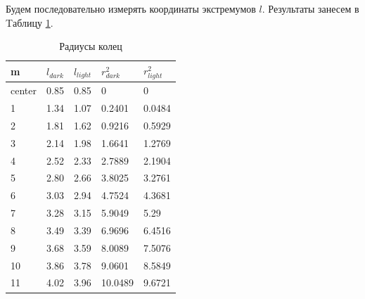 \documentclass[a4paper,12pt]{article}
\begin{document}
	Будем последовательно измерять координаты экстремумов $ l $. Результаты занесем в Tаблицу \ref{table::rings}.
	
\newpage
\begin{table}
\begin{minipage}{0.5\textwidth}
\begin{tabular}{|l|l|l|l|l|}
\hline
m      & $l_{dark}$ & $l_{light}$ & $r_{dark}^2$ & $r_{light}^2$ \\ \hline
center & 0.85           & 0.85            & 0                         & 0                          \\ \hline
1      & 1.34           & 1.07            & 0.2401                    & 0.0484                     \\ \hline
2      & 1.81           & 1.62            & 0.9216                    & 0.5929                     \\ \hline
3      & 2.14           & 1.98            & 1.6641                    & 1.2769                     \\ \hline
4      & 2.52           & 2.33            & 2.7889                    & 2.1904                     \\ \hline
5      & 2.80           & 2.66            & 3.8025                    & 3.2761                     \\ \hline
6      & 3.03           & 2.94            & 4.7524                    & 4.3681                     \\ \hline
7      & 3.28           & 3.15            & 5.9049                    & 5.29                       \\ \hline
8      & 3.49           & 3.39            & 6.9696                    & 6.4516                     \\ \hline
9      & 3.68           & 3.59            & 8.0089                    & 7.5076                     \\ \hline
10     & 3.86           & 3.78            & 9.0601                    & 8.5849                     \\ \hline
11     & 4.02           & 3.96            & 10.0489                   & 9.6721                     \\ \hline
\end{tabular}
\label{table::rings}
\caption{Радиусы колец}
\end{minipage}
\begin{minipage}{0.5\textwidth}
\begin{center}
    \begin{tikzpicture}[scale=1]

\end{tikzpicture}
\end{center}
\end{minipage}
\end{table}
\end{document}
